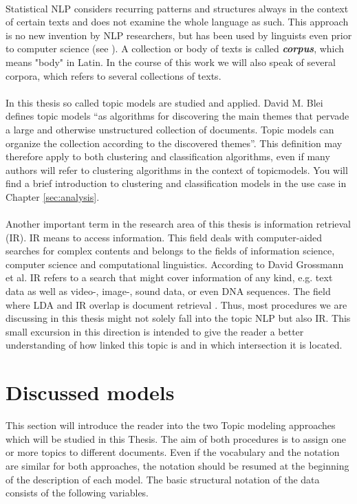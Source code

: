 \documentclass[11pt,a4paper]{article}
\begin{document}
\ \\
Statistical NLP considers recurring patterns and structures always in the context of certain texts and does not examine the whole language as such. This approach is no new invention by NLP researchers, but has been used by linguists even prior to computer science (see \cite{Harris1951}). A collection or body of texts is called \textbf{\textit{corpus}}, which means "body" in Latin. In the course of this work we will also speak of several corpora, which refers to several collections of texts.\\
\ \\
In this thesis so called topic models are studied and applied. David M. Blei defines topic models “as algorithms for discovering the main themes that pervade a large and otherwise unstructured collection of documents. Topic models can organize the collection according to the discovered themes”\cite{Blei2012}. This definition may therefore apply to both clustering and classification algorithms, even if many authors will refer to clustering algorithms in the context of topicmodels. You will find a brief introduction to clustering and classification models in the use case in Chapter \ref{sec:analysis}.\\
\ \\
Another important term in the research area of this thesis is information retrieval (IR). IR means to access information. This field deals with computer-aided searches for complex contents and belongs to the fields of information science, computer science and computational linguistics. According to David Grossmann et al. IR refers to a search that might cover information of any kind, e.g. text data as well as video-, image-, sound data, or even DNA sequences. The field where LDA and IR overlap is document retrieval \cite{Grossmann2004}. Thus, most procedures we are discussing in this thesis might not solely fall into the topic NLP but also IR. This small excursion in this direction is intended to give the reader a better understanding of how linked this topic is and in which intersection it is located.  








\section{Discussed models}

This section will introduce the reader into the two Topic modeling approaches which will be studied in this Thesis. The aim of both procedures is to assign one or more topics to different documents. Even if the vocabulary and the notation are similar for both approaches, the notation should be resumed at the beginning of the description of each model. The basic structural notation of the data consists of the following variables.
\end{document}
